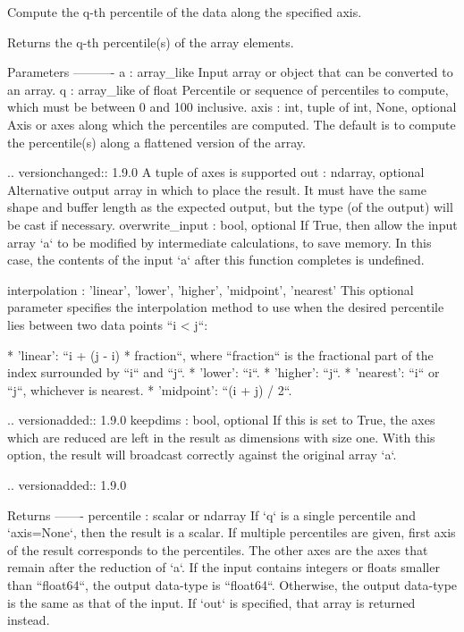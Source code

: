 \begin{DoxyVerb}Compute the q-th percentile of the data along the specified axis.

Returns the q-th percentile(s) of the array elements.

Parameters
----------
a : array_like
    Input array or object that can be converted to an array.
q : array_like of float
    Percentile or sequence of percentiles to compute, which must be between
    0 and 100 inclusive.
axis : {int, tuple of int, None}, optional
    Axis or axes along which the percentiles are computed. The
    default is to compute the percentile(s) along a flattened
    version of the array.

    .. versionchanged:: 1.9.0
        A tuple of axes is supported
out : ndarray, optional
    Alternative output array in which to place the result. It must
    have the same shape and buffer length as the expected output,
    but the type (of the output) will be cast if necessary.
overwrite_input : bool, optional
    If True, then allow the input array `a` to be modified by intermediate
    calculations, to save memory. In this case, the contents of the input
    `a` after this function completes is undefined.

interpolation : {'linear', 'lower', 'higher', 'midpoint', 'nearest'}
    This optional parameter specifies the interpolation method to
    use when the desired percentile lies between two data points
    ``i < j``:

    * 'linear': ``i + (j - i) * fraction``, where ``fraction``
      is the fractional part of the index surrounded by ``i``
      and ``j``.
    * 'lower': ``i``.
    * 'higher': ``j``.
    * 'nearest': ``i`` or ``j``, whichever is nearest.
    * 'midpoint': ``(i + j) / 2``.

    .. versionadded:: 1.9.0
keepdims : bool, optional
    If this is set to True, the axes which are reduced are left in
    the result as dimensions with size one. With this option, the
    result will broadcast correctly against the original array `a`.

    .. versionadded:: 1.9.0

Returns
-------
percentile : scalar or ndarray
    If `q` is a single percentile and `axis=None`, then the result
    is a scalar. If multiple percentiles are given, first axis of
    the result corresponds to the percentiles. The other axes are
    the axes that remain after the reduction of `a`. If the input
    contains integers or floats smaller than ``float64``, the output
    data-type is ``float64``. Otherwise, the output data-type is the
    same as that of the input. If `out` is specified, that array is
    returned instead.


\end{DoxyVerb}
